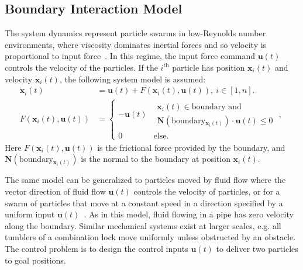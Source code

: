 \subsection{Boundary Interaction Model}\label{subsec:WallFriction}
 The system dynamics represent particle swarms in low-Reynolds number environments, where viscosity dominates inertial forces and so velocity is proportional to input force~\cite{Purcell1977}. 
 In this regime, the input force command $\mathbf{u}(t)$ controls the velocity of the particles.  
 If the $i^{\textrm{th}}$ particle has position $\mathbf{x}_i(t)$ and velocity $\dot{\mathbf{x}}_i(t)$, the following system model is assumed:
 \begin{align}\label{eq:swarmDynamicsAndFric} 
\dot{\mathbf{x}}_i(t)
 &=
 \mathbf{u}(t)
 +F \left( \mathbf{x}_i(t), \mathbf{u}(t) \right), ~i \in [1,n].\\
 F(\mathbf{x}_i(t), \mathbf{u}(t)) &= \begin{cases}
  - \mathbf{u}(t) &\begin{matrix} \mathbf{x}_i(t) \in  \textrm{boundary and}\\
\mathbf{N}(\textrm{boundary$_{\mathbf{x}_i(t)}$})\cdot   \mathbf{u}(t) \le 0 \end{matrix}
\textrm{    ,} \\
 0 & \textrm{else}.
 \end{cases}\nonumber
 \end{align}
 Here  $F(\mathbf{x}_i(t), \mathbf{u}(t)) $ is the frictional force provided by the boundary, and
 $\mathbf{N}(\textrm{boundary$_{\mathbf{x}_i(t)}$})$ is the normal to the boundary at position $\mathbf{x}_i(t)$.
 
 
  The same model can be generalized to particles moved by fluid flow where the vector direction of fluid flow $\mathbf{u}(t)$ controls the velocity of particles, or for a swarm of particles that move at a constant speed in a direction specified by a uniform input $\mathbf{u}(t)$~\cite{Rubenstein2012}.
  As in this model, fluid flowing in a pipe has zero velocity along the boundary. Similar mechanical systems exist at larger scales, e.g. all tumblers of a combination lock move uniformly unless obstructed by an obstacle.
The control problem is to design the control inputs $\mathbf{u}(t)$ to deliver two particles to goal positions.
 
